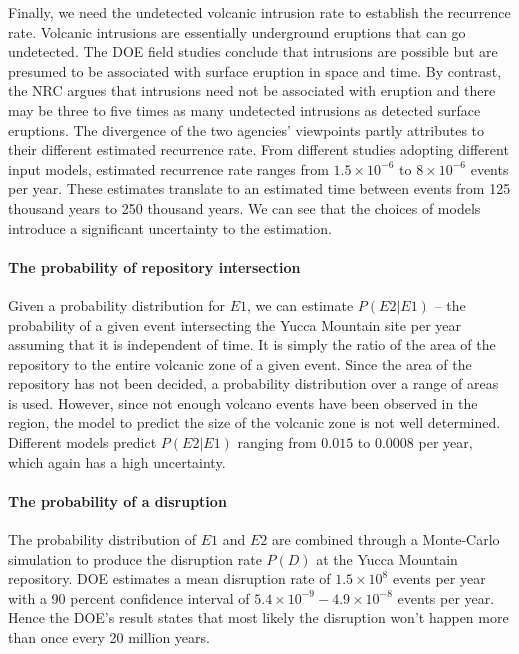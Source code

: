 \documentclass[nofootinbib,preprint,aps]{revtex4-1}
\begin{document}
        Finally, we need the undetected volcanic intrusion rate to establish the recurrence rate. Volcanic
        intrusions are essentially underground eruptions that can go undetected. The DOE field studies conclude
        that intrusions are possible but are presumed to be associated with surface eruption in space and time. 
        By contrast, the NRC argues that intrusions need not be associated with eruption and there
        may be three to five times as many undetected intrusions as detected surface eruptions. The divergence
        of the two agencies' viewpoints partly attributes to their different estimated recurrence rate.
        From different studies adopting different input models, estimated recurrence rate ranges from
        $1.5\times 10^{-6}$ to $8\times 10^{-6}$ events per year. These estimates translate to an estimated
        time between events from 125 thousand years to 250 thousand years. We can see that the choices of
        models introduce a significant uncertainty to the estimation.\cite{cv14}

        \paragraph{The probability of repository intersection}
        Given a probability distribution for $E1$, we can estimate $P(E2|E1)$ -- the probability of
        a given event intersecting the Yucca Mountain site per year assuming that it is independent
        of time. It is simply the ratio of the area of
        the repository to the entire volcanic zone of a given event. Since the area of the repository
        has not been decided, a probability distribution over a range of areas is used.
        However, since not enough volcano events have been observed in the region, the model
        to predict the size of the volcanic zone is not well determined.
        Different models predict $P(E2|E1)$ ranging from $0.015$ to $0.0008$ per year, which again has a high
        uncertainty.

        \paragraph{The probability of a disruption} The probability distribution of $E1$ and $E2$
        are combined through a Monte-Carlo simulation to produce the disruption rate $P(D)$
        at the Yucca Mountain repository. DOE estimates a mean disruption rate of $1.5\times 10^8$ events
        per year with
        a 90 percent confidence interval of $5.4\times 10^{-9}-4.9\times 10^{-8}$ events per year. Hence the DOE's result
        states that most likely the disruption won't happen more than once every 20 million years.
\end{document}
